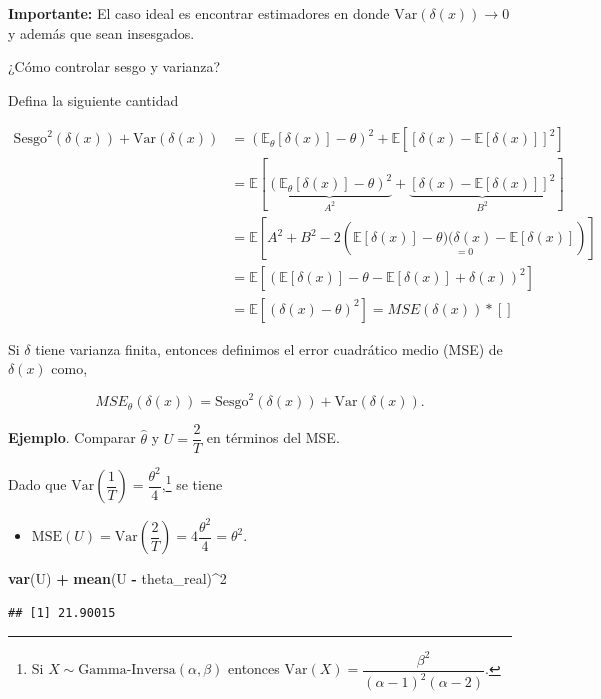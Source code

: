 \documentclass[
  12pt,
]{book}
\newenvironment{Shaded}{\begin{snugshade}}{\end{snugshade}}
\newcommand{\DecValTok}[1]{\textcolor[rgb]{0.00,0.00,0.81}{#1}}
\newcommand{\KeywordTok}[1]{\textcolor[rgb]{0.13,0.29,0.53}{\textbf{#1}}}
\newcommand{\NormalTok}[1]{#1}
\newcommand{\OperatorTok}[1]{\textcolor[rgb]{0.81,0.36,0.00}{\textbf{#1}}}
\newcommand{\StringTok}[1]{\textcolor[rgb]{0.31,0.60,0.02}{#1}}
\providecommand{\tightlist}{%
  \setlength{\itemsep}{0pt}\setlength{\parskip}{0pt}}
\begin{document}
\textbf{Importante:} El caso ideal es encontrar estimadores en donde
\(\text{Var}(\delta(x))\to 0\) y además que sean insesgados.

¿Cómo controlar sesgo y varianza?

Defina la siguiente cantidad

\begin{align*}
\text{Sesgo}^2(\delta(x))+\text{Var}(\delta(x)) & = (\mathbb E_\theta[\delta(x)]-\theta)^2 + \mathbb E[[\delta(x)-\mathbb E[\delta(x)]]^2]\\
	& =\mathbb E[ \underbrace{(\mathbb E_\theta[\delta(x)]-\theta)^2}_{A^2} + \underbrace{[\delta(x)-\mathbb E[\delta(x)]]^2}_{B^2}]\\
	& = \mathbb E[A^2+B^2 - 2(\underset{=0}{\mathbb E[\delta(x)]-\theta)(\delta(x)-\mathbb E[\delta(x)]})]\\
	& =  \mathbb E[(\mathbb E[\delta(x)]-\theta - \mathbb E[\delta(x)] + \delta(x))^2]\\
	& = \mathbb E[(\delta(x)-\theta)^2] = MSE(\delta(x))
  * [ ] \end{align*}

Si \(\delta\) tiene varianza finita, entonces definimos el error cuadrático medio
(MSE) de \(\delta(x)\) como,

\[MSE_{\theta}(\delta(x)) =\text{Sesgo}^2(\delta(x)) + \text{Var}(\delta(x)).\]

\textbf{Ejemplo}. Comparar \(\hat\theta\) y \(U =\dfrac 2T\) en términos del MSE.

Dado que \(\text{Var}\left(\dfrac 1T\right) = \dfrac{\theta^2}4\),\footnote{Si \(X\sim\text{Gamma-Inversa}(\alpha, \beta)\) entonces \(\text{Var}(X)=\dfrac{\beta ^{2}}{(\alpha -1)^2(\alpha-2)}\).} se tiene

\begin{itemize}
\tightlist
\item
  \(\mathrm{MSE}(U) = \text{Var}\left(\dfrac 2T\right) = 4\dfrac{\theta^2}4 = \theta^2\).
\end{itemize}

\begin{Shaded}
\begin{Highlighting}[]
\KeywordTok{var}\NormalTok{(U) }\OperatorTok{+}\StringTok{ }\KeywordTok{mean}\NormalTok{(U }\OperatorTok{{-}}\StringTok{ }\NormalTok{theta\_real)}\OperatorTok{\^{}}\DecValTok{2}
\end{Highlighting}
\end{Shaded}

\begin{verbatim}
## [1] 21.90015
\end{verbatim}
\end{document}
